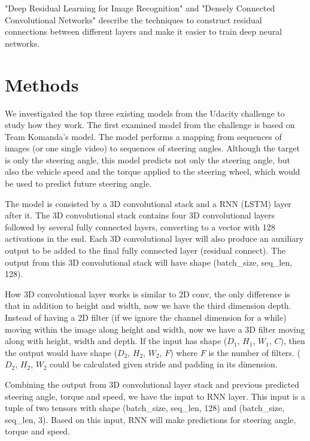 \documentclass[10pt,twocolumn,letterpaper]{article}
\begin{document}
"Deep Residual Learning for Image Recognition" \cite{he2016deep} and "Densely Connected Convolutional Networks" \cite{huang2016densely} describe the techniques to construct residual connections between different layers and make it easier to train deep neural networks. 


\section{Methods}

We investigated the top three existing models from the Udacity challenge to study how they work. The first examined model from the challenge is based on Team Komanda's model. The model performs a mapping from sequences of images (or one single video) to sequences of steering angles. Although the target is only the steering angle, this model predicts not only the steering angle, but also the vehicle speed and the torque applied to the steering wheel, which would be used to predict future steering angle. 

The model is consisted by a 3D convolutional stack and a RNN (LSTM) layer after it. The 3D convolutional stack contains four 3D convolutional layers followed by several fully connected layers, converting to a vector with 128 activations in the end. Each 3D convolutional layer will also produce an auxiliary output to be added to the final fully connected layer (residual connect). The output from this 3D convolutional stack will have shape (batch\_size, seq\_len, 128).

How 3D convolutional layer works is similar to 2D conv, the only difference is that in addition to height and width, now we have the third dimension depth. Instead of having a 2D filter (if we ignore the channel dimension for a while) moving within the image along height and width, now we have a 3D filter moving along with height, width and depth. If the input has shape ($D_{1}$, $H_{1}$,  $W_{1}$, $C$), then the output would have shape ($D_{2}$, $H_{2}$, $W_{2}$, $F$) where $F$ is the number of filters. ($D_{2}$, $H_{2}$, $W_{2}$ could be calculated given stride and padding in its dimension.

Combining the output from 3D convolutional layer stack and previous predicted steering angle, torque and speed, we have the input to RNN layer. This input is a tuple of two tensors with shape (batch\_size, seq\_len, 128) and (batch\_size, seq\_len, 3). Based on this input, RNN will make predictions for steering angle, torque and speed. 
\end{document}
